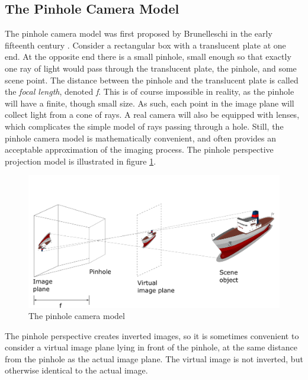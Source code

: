 \subsection{The Pinhole Camera Model}
\label{section:pinhole}
The pinhole camera model was first proposed by Brunelleschi in the early fifteenth century \cite{modernCV}. Consider a rectangular box with a translucent plate at one end. At the opposite end there is a small pinhole, small enough so that exactly one ray of light would pass through the translucent plate, the pinhole, and some scene point. The distance between the pinhole and the translucent plate is called the \textit{focal length}, denoted \textit{f}. This is of course impossible in reality, as the pinhole will have a finite, though small size. As such, each point in the image plane will collect light from a cone of rays. A real camera will also be equipped with lenses, which complicates the simple model of rays passing through a hole. Still, the pinhole camera model is mathematically convenient, and often provides an acceptable approximation of the imaging process. The pinhole perspective projection model is illustrated in figure \ref{fig:pinhole_model}.
\begin{figure}[H]
    \centering
    \includegraphics[width=\linewidth]{pinhole.png}
    \caption{The pinhole camera model}
    \label{fig:pinhole_model}
\end{figure}
The pinhole perspective creates inverted images, so it is sometimes convenient to consider a virtual image plane lying in front of the pinhole, at the same distance from the pinhole as the actual image plane. The virtual image is not inverted, but otherwise identical to the actual image.


